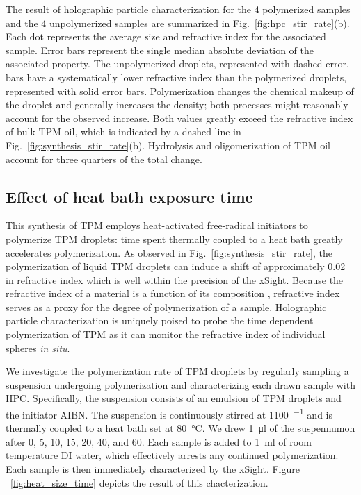 The result of holographic particle characterization for the \num{4} polymerized samples
and the \num{4} unpolymerized samples are summarized in Fig.~\ref{fig:hpc_stir_rate}(b).
Each dot represents the average size and refractive index for the associated sample. Error
bars represent the single median absolute deviation of the associated property.
The unpolymerized droplets, represented with dashed error, bars have a systematically
lower refractive index than the polymerized droplets, represented with solid error bars.
Polymerization changes the chemical makeup of the droplet and generally increases the
density; %
both processes might reasonably account for the observed increase.
Both values greatly exceed the refractive index of bulk TPM oil, which is indicated by
a dashed line in Fig.~\ref{fig:synthesis_stir_rate}(b).
Hydrolysis and oligomerization of TPM oil account for three quarters of
the total change.




\subsection{Effect of heat bath exposure time}

This synthesis of TPM employs heat-activated free-radical initiators to polymerize TPM droplets:
time spent thermally coupled to a heat bath greatly accelerates polymerization.
As observed in Fig.~\ref{fig:synthesis_stir_rate}, the polymerization of
liquid TPM droplets can induce a shift of approximately \SI{0.02}{} in refractive index
which is well within the precision of the xSight.  Because the refractive index
of a material is a function of its composition \cite{wang15},
refractive index serves as a proxy for the degree of
polymerization of a sample.  Holographic particle
characterization is uniquely poised to probe the time dependent polymerization of TPM as
it can monitor the refractive index of individual spheres \emph{in situ}.

We investigate the polymerization rate of TPM droplets by regularly sampling a
suspension undergoing polymerization and characterizing each drawn sample with HPC.
Specifically, the suspension consists of an emulsion of TPM droplets
and the initiator AIBN. The suspension is continuously stirred at \SI{1100}{\min^{-1}}
and is thermally coupled to a heat bath set at \SI{80}{\degreeCelsius}.
We drew \SI{1}{\ul} of the suspennumon after \num{0}, \num{5}, \num{10}, \num{15},
\num{20}, \num{40}, and \SI{60}{\min}. Each sample is added to \SI{1}{\ml} of
room temperature DI water, which effectively arrests any continued polymerization.
Each sample is then immediately characterized by the xSight. Figure ~\ref{fig:heat_size_time}
depicts the result of this chacterization.


